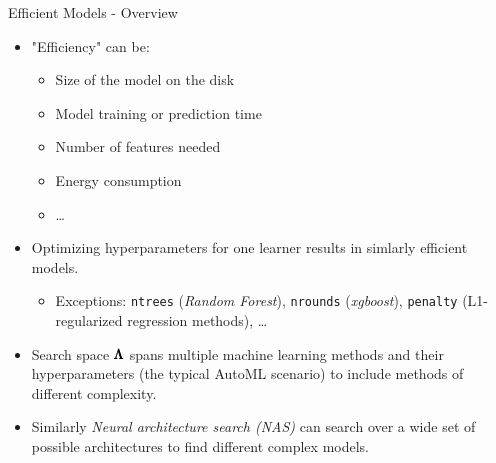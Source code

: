 \begin{frame}{Efficient Models - Overview}

\begin{itemize}
  \item "Efficiency" can be:
  \begin{itemize}
    \item Size of the model on the disk
    \item Model training or prediction time
    \item Number of features needed
    \item Energy consumption
    \item \ldots
  \end{itemize}
  \item Optimizing hyperparameters for one learner results in simlarly efficient models.
  \begin{itemize}
    \item Exceptions: \texttt{ntrees} (\emph{Random Forest}), \texttt{nrounds} (\emph{xgboost}), \texttt{penalty} (L1-regularized regression methods), \ldots
  \end{itemize}
  \item Search space $\pmb{\Lambda}$ spans multiple machine learning methods and their hyperparameters (the typical AutoML scenario) to include methods of different complexity.
  \item Similarly \emph{Neural architecture search (NAS)} can search over a wide set of possible architectures to find different complex models.
\end{itemize}

\end{frame}


